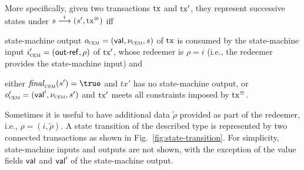 More specifically, given two transactions $\mathrm{tx}$ and $\mathrm{tx}'$, they represent successive states under \({s}\overset{i}\longrightarrow(s', \mathrm{tx}^\equiv)\) iff 
%
\begin{mitemize}
  \item state-machine output $o_{\textsc{cem}} = (\mathsf{val}, \nu_{\textsc{cem}}, s)$ of $\mathrm{tx}$
  is consumed by the state-machine input $i_{\textsc{cem}}' = (\mathsf{out\textsf{-}{}ref}, \rho)$
  of $\mathrm{tx}'$, whose redeemer is \(\rho = i\) (i.e., the redeemer
  provides the state-machine input) and
  \item either $\cemFinal(s') = \true$ and $tx'$ has no state-machine
  output, or $o_{\textsc{cem}}' = (\mathsf{val}', \nu_{\textsc{cem}}, s')$ and $\mathrm{tx}'$ meets all
  constraints imposed by $\mathrm{tx}^\equiv$.
\end{mitemize}
Sometimes it is useful to have additional data $\tilde \rho$ provided
as part of the redeemer, i.e., $\rho = (i,\tilde \rho)$.
%
A state transition of the described type is represented by two connected
transactions as shown in Fig.~\ref{fig:state-transition}.  For
simplicity, state-machine inputs and outputs are not shown, with the
exception of the value fields $\mathsf{val}$ and $\mathsf{val}'$ of the state-machine output.


